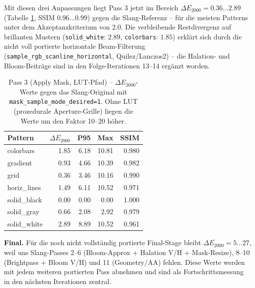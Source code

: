 \documentclass[11pt, a4paper]{article}
\newcommand{\tableheadercolor}{\rowcolor{hkared}}
\newcommand{\thw}[1]{\color{white}\textbf{#1}}  %
\begin{document}
Mit diesen drei Anpassungen liegt Pass 3 jetzt im Bereich $\overline{\Delta E_{2000}} = 0.36 \dots 2.89$ (Tabelle \ref{tab:dE-pass3}, SSIM $0.96 \dots 0.99$) gegen die Slang-Referenz -- f\"ur die meisten Patterns unter dem Akzeptanzkriterium von $2.0$. Die verbleibende Restdivergenz auf brillanten Mustern (\texttt{solid\_white}: $2.89$, \texttt{colorbars}: $1.85$) erkl\"art sich durch die nicht voll portierte horizontale Beam-Filterung (\texttt{sample\_rgb\_scanline\_horizontal}, Quilez/Lanczos2) -- die Halation- und Bloom-Beitr\"age sind in den Folge-Iterationen 13--14 erg\"anzt worden.

\vspace{.25cm}
\begin{table}[H]
\centering
\small
{}
\begin{tabularx}{\textwidth}{lrrrr}
    \toprule
    \tableheadercolor \thw{Pattern} & \thw{$\overline{\Delta E_{2000}}$} & \thw{P95} & \thw{Max} & \thw{SSIM} \\
    \midrule
    colorbars   & 1.85 &  6.18 & 10.81 & 0.980 \\
    gradient    & 0.93 &  4.66 & 10.39 & 0.982 \\
    grid        & 0.36 &  3.46 & 10.16 & 0.990 \\
    horiz\_lines & 1.49 &  6.11 & 10.52 & 0.971 \\
    solid\_black & 0.00 &  0.00 &  0.00 & 1.000 \\
    solid\_gray  & 0.66 &  2.08 &  2.92 & 0.979 \\
    solid\_white & 2.89 &  8.89 & 10.52 & 0.961 \\
    \bottomrule
\end{tabularx}
 \vspace{.25cm}
\caption{Pass 3 (Apply Mask, LUT-Pfad) -- $\Delta E_{2000}$-Werte gegen das Slang-Original mit \texttt{mask\_sample\_mode\_desired=1}. Ohne LUT (prozedurale Aperture-Grille) liegen die Werte um den Faktor 10--20 h\"oher.}
\label{tab:dE-pass3}
\end{table}

\textbf{Final.} F\"ur die noch nicht vollst\"andig portierte Final-Stage bleibt $\overline{\Delta E_{2000}} = 5 \dots 27$, weil uns Slang-Passes 2--6 (Bloom-Approx + Halation V/H + Mask-Resize), 8--10 (Brightpass + Bloom V/H) und 11 (Geometry/AA) fehlen. Diese Werte werden mit jedem weiteren portierten Pass abnehmen und sind als Fortschrittsmessung in den n\"achsten Iterationen zentral.

\newpage \vspace*{-.5cm}
\end{document}
